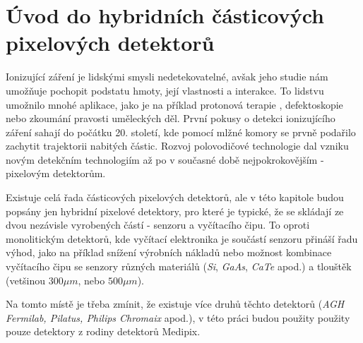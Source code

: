 

\chapter{Úvod do hybridních částicových pixelových detektorů}\label{chap:detectors}
Ionizující záření je lidskými smysli nedetekovatelné, avšak jeho studie nám umožňuje pochopit podstatu hmoty, její vlastnosti a interakce. To lidstvu umožnilo mnohé aplikace, jako je na příklad protonová terapie \cite{tpx_app_radiotherapy}, defektoskopie nebo zkoumání pravosti uměleckých děl. První pokusy o detekci ionizujícího záření sahají do počátku 20. století, kde pomocí mlžné komory se prvně podařilo zachytit trajektorii nabitých částic. Rozvoj polovodičové technologie dal vzniku novým detekčním technologiím až po v současné době nejpokrokovějším - pixelovým detektorům.

Existuje celá řada částicových pixelových detektorů, ale v této kapitole budou popsány jen hybridní pixelové detektory, pro které je typické, že se skládají ze dvou nezávisle vyrobených částí - senzoru a vyčítacího čipu. To oproti monolitickým detektorů, kde vyčítací elektronika je součástí senzoru přináší řadu výhod, jako na příklad snížení výrobních nákladů nebo možnost kombinace vyčítacího čipu se senzory různých materiálů (\textit{Si}, \textit{GaAs}, \textit{CaTe} apod.) a tlouštěk (vetšinou $300\mu m$, nebo $500\mu m$).

Na tomto místě je třeba zmínit, že existuje více druhů těchto detektorů (\textit{AGH Fermilab, Pilatus, Philips Chromaix} apod.)\cite{detectors_review}, v této práci budou použity použity pouze detektory z rodiny detektorů Medipix.

